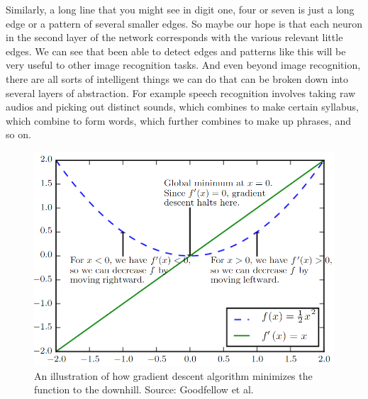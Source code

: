 \documentclass[master]{thesis-uestc}
\begin{document}
Similarly, a long line that you might see in digit one, four or seven is just a long edge or a pattern of several smaller edges. So maybe our hope is that each neuron in the second layer of the network corresponds with the various relevant little edges. We can see that been able to detect edges and patterns like this will be very useful to other image recognition tasks. And even beyond image recognition, there are all sorts of intelligent things we can do that can be broken down into several layers of abstraction. For example speech recognition involves taking raw audios and picking out distinct sounds, which combines to make certain syllabus, which combine to form words, which further combines to make up phrases, and so on.

\begin{figure}[ht]
\includegraphics[width=5in]{pic/gradient_descent.PNG}
\caption{An illustration of how gradient descent algorithm minimizes the function to the downhill. Source: Goodfellow et al.\cite{Goodfellow-et-al-2016}}
\label{fig_gradient_descent}
\end{figure}
\end{document}
